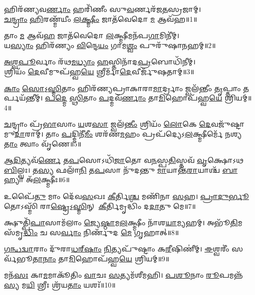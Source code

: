 

{\centering
𑌹𑌿𑌰᳴𑌣𑍍𑌯𑌵\-\ul{𑌰𑍍𑌣𑌾𑌂} 𑌹𑌰𑌿᳴𑌣𑍀𑌂 𑌸𑍁\-\ul{𑌵}\-𑌰𑍍𑌣𑌰᳴𑌜\-\ul{𑌤}\-𑌸𑍍𑌰𑌜𑌾𑌮𑍍।\\
\-\ul{𑌚}\-\-\ul{𑌨𑍍𑌦𑍍𑌰𑌾𑌂} \ul{𑌹𑌿}\-𑌰𑌣𑍍𑌮᳴𑌯𑍀𑌂 \ul{𑌲}\-\-\ul{𑌕𑍍𑌷𑍍𑌮𑍀𑌂} 𑌜𑌾𑌤᳴𑌵𑍇𑌦𑍋 \ul{𑌮} 𑌆𑌵᳴𑌹॥1॥

𑌤𑌾𑌂 \ul{𑌮} 𑌆𑌵᳴\-\ul{𑌹} 𑌜𑌾𑌤᳴𑌵𑍇𑌦𑍋 \ul{𑌲}\-𑌕𑍍𑌷𑍍𑌮𑍀𑌮𑌨᳴𑌪\-\ul{𑌗𑌾}\-𑌮𑌿𑌨𑍀॑𑌮𑍍।\\
𑌯\-\ul{𑌸𑍍𑌯𑌾𑌂} 𑌹𑌿𑌰᳴𑌣𑍍𑌯𑌂 \ul{𑌵𑌿}\-𑌨𑍍𑌦𑍇\-\ul{𑌯𑌂} 𑌗𑌾𑌮\-\ul{𑌶𑍍𑌵𑌂} 𑌪𑍁𑌰𑍁᳴𑌷𑌾\-\ul{𑌨}\-𑌹𑌮𑍍॥2॥

\-\ul{𑌅}\-\-\ul{𑌶𑍍𑌵}\-\-\ul{𑌪𑍂}\-𑌰𑍍𑌵𑌾𑌂 𑌰᳴𑌥\-\ul{𑌮}\-\-\ul{𑌧𑍍𑌯𑌾𑌂} \ul{𑌹}\-𑌸𑍍𑌤𑌿𑌨𑌾᳴𑌦\-\ul{𑌪𑍍𑌰}\-𑌬𑍋𑌧𑌿᳴𑌨𑍀𑌮𑍍।\\
𑌶𑍍𑌰𑌿𑌯𑌂᳴ \ul{𑌦𑍇}\-𑌵𑍀𑌮𑍁𑌪᳴𑌹𑍍𑌵\-\ul{𑌯𑍇} 𑌶𑍍𑌰𑍀𑌰𑍍𑌮𑌾᳴\-\ul{𑌦𑍇}\-𑌵𑍀𑌰𑍍𑌜𑍁᳴𑌷𑌤𑌾𑌮𑍍॥3॥

}

\-\ul{𑌕𑌾𑌂} \ul{𑌸𑍋}\-𑌽॒\-\ul{𑌸𑍍𑌮𑌿}\-𑌤𑌾𑌂 𑌹𑌿𑌰᳴𑌣𑍍𑌯𑌪𑍍𑌰𑌾𑌕𑌾𑌰𑌾\-\ul{𑌮𑌾}\-𑌰𑍍𑌦𑍍𑌰𑌾𑌂 𑌜𑍍𑌵𑌲᳴𑌨𑍍𑌤𑍀𑌂 \ul{𑌤𑍃}\-𑌪𑍍𑌤𑌾𑌂 \ul{𑌤}\-𑌰𑍍𑌪𑌯᳴𑌨𑍍𑌤𑍀𑌮𑍍।
\-\ul{𑌪}\-\-\ul{𑌦𑍍𑌮𑍇} \ul{𑌸𑍍𑌥𑌿}\-𑌤𑌾𑌂 \ul{𑌪}\-𑌦𑍍𑌮𑌵᳴\-\ul{𑌰𑍍𑌣𑌾𑌂} 𑌤𑌾\-\ul{𑌮𑌿}\-𑌹𑍋𑌪᳴𑌹𑍍𑌵\-\ul{𑌯𑍇} 𑌶𑍍𑌰𑌿𑌯𑌮𑍍॥4॥

\-\ul{𑌚}\-𑌨𑍍𑌦𑍍𑌰𑌾𑌂 𑌪𑍍𑌰᳴\-\ul{𑌭𑌾}\-𑌸𑌾𑌂 \ul{𑌯}\-𑌶\-\ul{𑌸𑌾} 𑌜𑍍𑌵𑌲᳴\-\ul{𑌨𑍍𑌤𑍀𑌂} 𑌶𑍍𑌰𑌿𑌯𑌂᳴ \ul{𑌲𑍋}\-𑌕𑍇 \ul{𑌦𑍇}\-𑌵𑌜𑍁᳴𑌷𑍍𑌟𑌾𑌮𑍁\-\ul{𑌦𑌾}\-𑌰𑌾𑌮𑍍।
𑌤𑌾𑌂 \ul{𑌪}\-𑌦𑍍𑌮𑌿𑌨𑍀᳴\-\ul{𑌮𑍀𑌂} 𑌶𑌰᳴𑌣\-\ul{𑌮}\-𑌹𑌂 𑌪𑍍𑌰𑌪᳴𑌦𑍍𑌯𑍇𑌽\-\ul{𑌲}\-𑌕𑍍𑌷𑍍𑌮𑍀𑌰𑍍𑌮𑍇᳴ 𑌨𑌶𑍍𑌯\-\ul{𑌤𑌾𑌂} 𑌤𑍍𑌵𑌾𑌂 𑌵𑍃᳴𑌣𑍇॥5॥

\-\ul{𑌆}\-\-\ul{𑌦𑌿}\-𑌤𑍍𑌯𑌵᳴\-\ul{𑌰𑍍𑌣𑍇} 𑌤\-\ul{𑌪}\-𑌸𑍋𑌽𑌧𑌿᳴\-\ul{𑌜𑌾}\-𑌤𑍋 𑌵\-\ul{𑌨}\-𑌸𑍍𑌪\-\ul{𑌤𑌿}\-𑌸𑍍𑌤𑌵᳴ \ul{𑌵𑍃}\-𑌕𑍍𑌷𑍋𑌽𑌥 \ul{𑌬𑌿}\-𑌲𑍍𑌵𑌃।
𑌤\-\ul{𑌸𑍍𑌯} 𑌫𑌲𑌾᳴\-\ul{𑌨𑌿} 𑌤\-\ul{𑌪}\-𑌸𑌾 𑌨𑍁᳴𑌦𑌨𑍍𑌤𑍁 \ul{𑌮𑌾}\-𑌯𑌾𑌨𑍍𑌤᳴\-\ul{𑌰𑌾}\-𑌯𑌾𑌶𑍍𑌚᳴ \ul{𑌬𑌾}\-𑌹𑍍𑌯𑌾 𑌅᳴\-\ul{𑌲}\-𑌕𑍍𑌷𑍍𑌮𑍀𑌃॥6॥

𑌉𑌪𑍈᳴\-\ul{𑌤𑍁} 𑌮𑌾𑌂 𑌦𑍇᳴𑌵\-\ul{𑌸}\-𑌖𑌃 \ul{𑌕𑍀}\-𑌰𑍍𑌤𑌿\-\ul{𑌶𑍍𑌚} 𑌮𑌣𑌿᳴𑌨𑌾 \ul{𑌸}\-𑌹।
\-\ul{𑌪𑍍𑌰𑌾}\-\-\ul{𑌦𑍁}\-\-\ul{𑌰𑍍𑌭𑍂}\-𑌤𑍋𑌽𑌸𑍍𑌮𑌿᳴ 𑌰𑌾\-\ul{𑌷𑍍𑌟𑍍𑌰𑍇}\-𑌽॒\-\ul{𑌸𑍍𑌮𑌿}\-𑌨𑍍 \ul{𑌕𑍀}\-𑌰𑍍𑌤𑌿𑌮𑍃𑌦𑍍𑌧𑌿𑌂᳴ 𑌦\-\ul{𑌦𑌾}\-𑌤𑍁 𑌮𑍇॥7॥

𑌕𑍍𑌷𑍁𑌤𑍍𑌪𑌿᳴\-\ul{𑌪𑌾}\-𑌸𑌾𑌮᳴𑌲𑌾𑌂 \ul{𑌜𑍍𑌯𑍇}\-\-\ul{𑌷𑍍𑌠𑌾}\-𑌮\-\ul{𑌲}\-𑌕𑍍𑌷𑍍𑌮𑍀𑌂 𑌨𑌾᳴𑌶\-\ul{𑌯𑌾}\-𑌮𑍍𑌯𑌹𑌮𑍍।
𑌅𑌭𑍂᳴\-\ul{𑌤𑌿}\-\-𑌮𑌸᳴𑌮𑍃\-\ul{𑌦𑍍𑌧𑌿𑌂} 𑌚 𑌸\-\ul{𑌰𑍍𑌵𑌾𑌂} 𑌨𑌿𑌰𑍍𑌣𑍁᳴𑌦 \ul{𑌮𑍇} 𑌗𑍃𑌹𑌾𑌤𑍍॥8॥

\-\ul{𑌗}\-\-\ul{𑌨𑍍𑌧}\-\-\ul{𑌦𑍍𑌵𑌾}\-𑌰𑌾𑌂 𑌦𑍁᳴𑌰𑌾\-\ul{𑌧}\-\ul{𑌰𑍍}‌\-\ul{𑌷𑌾𑌂} \ul{𑌨𑌿}\-𑌤𑍍𑌯𑌪𑍁᳴𑌷𑍍𑌟𑌾𑌂 𑌕\-\ul{𑌰𑍀}\-𑌷𑌿𑌣𑍀॑𑌮𑍍।
\-\ul{𑌈}\-𑌶𑍍𑌵𑌰𑍀𑌂॑ 𑌸𑌰𑍍𑌵᳴𑌭𑍂\-\ul{𑌤𑌾}\-\-\ul{𑌨𑌾𑌂} 𑌤𑌾\-\ul{𑌮𑌿}\-𑌹𑍋𑌪᳴𑌹𑍍𑌵\-\ul{𑌯𑍇} 𑌶𑍍𑌰𑌿𑌯𑌮𑍍॥9॥

𑌮𑌨᳴\-\ul{𑌸𑌃} 𑌕𑌾\-\ul{𑌮}\-𑌮𑌾𑌕𑍂᳴𑌤𑌿𑌂 \ul{𑌵𑌾}\-𑌚𑌃 \ul{𑌸}\-𑌤𑍍𑌯𑌮᳴𑌶𑍀𑌮𑌹𑌿।
\-\ul{𑌪}\-\-\ul{𑌶𑍂}\-𑌨𑌾𑌂 \ul{𑌰𑍂}\-𑌪𑌮𑌨𑍍𑌨᳴\-\ul{𑌸𑍍𑌯} 𑌮\-\ul{𑌯𑌿} 𑌶𑍍𑌰𑍀𑌃 𑌶𑍍𑌰᳴𑌯\-\ul{𑌤𑌾𑌂} 𑌯𑌶𑌃᳴॥10॥

